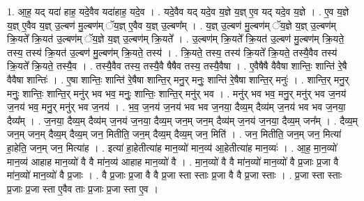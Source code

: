 \documentclass[17pt]{extarticle}
\begin{document}
1. आ॒ह॒ यद् यदा॑ हाह॒ यदे॒वैव यदा॑हाह॒ यदे॒व । . यदे॒वैव यद् यदे॒व य॒ज्ञे य॒ज्ञ् ए॒व यद् यदे॒व य॒ज्ञे । . ए॒व य॒ज्ञे य॒ज्ञ् ए॒वैव य॒ज्ञ् उ॒ल्बण॑ मु॒ल्बण॑म् ॅय॒ज्ञ् ए॒वैव य॒ज्ञ् उ॒ल्बण᳚म् । . य॒ज्ञ् उ॒ल्बण॑ मु॒ल्बण॑म् ॅय॒ज्ञे य॒ज्ञ् उ॒ल्बण॑म् क्रि॒यते᳚ क्रि॒यत॑ उ॒ल्बण॑म् ॅय॒ज्ञे य॒ज्ञ् उ॒ल्बण॑म् क्रि॒यते᳚ । . उ॒ल्बण॑म् क्रि॒यते᳚ क्रि॒यत॑ उ॒ल्बण॑ मु॒ल्बण॑म् क्रि॒यते॒ तस्य॒ तस्य॑ क्रि॒यत॑ उ॒ल्बण॑ मु॒ल्बण॑म् क्रि॒यते॒ तस्य॑ । . क्रि॒यते॒ तस्य॒ तस्य॑ क्रि॒यते᳚ क्रि॒यते॒ तस्यै॒वैव तस्य॑ क्रि॒यते᳚ क्रि॒यते॒ तस्यै॒व । . तस्यै॒वैव तस्य॒ तस्यै॒वै षैषैव तस्य॒ तस्यै॒वैषा । . ए॒वैषैषै वैवैषा शान्तिः॒ शान्ति॑ रे॒षै वैवैषा शान्तिः॑ । . ए॒षा शान्तिः॒ शान्ति॑ रे॒षैषा शान्ति॒र् मनु॒र् मनुः॒ शान्ति॑ रे॒षैषा शान्ति॒र् मनुः॑ । . शान्ति॒र् मनु॒र् मनुः॒ शान्तिः॒ शान्ति॒र् मनु॑र् भव भव॒ मनुः॒ शान्तिः॒ शान्ति॒र् मनु॑र् भव । . मनु॑र् भव भव॒ मनु॒र् मनु॑र् भव ज॒नय॑ ज॒नय॑ भव॒ मनु॒र् मनु॑र् भव ज॒नय॑ । . भ॒व॒ ज॒नय॑ ज॒नय॑ भव भव ज॒नया॒ दैव्य॒म् दैव्य॑म् ज॒नय॑ भव भव ज॒नया॒ दैव्य᳚म् । . ज॒नया॒ दैव्य॒म् दैव्य॑म् ज॒नय॑ ज॒नया॒ दैव्य॒म् जन॒म् जन॒म् दैव्य॑म् ज॒नय॑ ज॒नया॒ दैव्य॒म् जन᳚म् । . दैव्य॒म् जन॒म् जन॒म् दैव्य॒म् दैव्य॒म् जन॒ मितीति॒ जन॒म् दैव्य॒म् दैव्य॒म् जन॒ मिति॑ । . जन॒ मितीति॒ जन॒म् जन॒ मित्या॑ हा॒हेति॒ जन॒म् जन॒ मित्या॑ह । . इत्या॑ हा॒हेतीत्या॑ह मान॒व्यो॑ मान॒व्य॑ आ॒हेतीत्या॑ह मान॒व्यः॑ । . आ॒ह॒ मा॒न॒व्यो॑ मान॒व्य॑ आहाह मान॒व्यो॑ वै वै मा॑न॒व्य॑ आहाह मान॒व्यो॑ वै । . मा॒न॒व्यो॑ वै वै मा॑न॒व्यो॑ मान॒व्यो॑ वै प्र॒जाः प्र॒जा वै मा॑न॒व्यो॑ मान॒व्यो॑ वै प्र॒जाः । . वै प्र॒जाः प्र॒जा वै वै प्र॒जा स्ता स्ताः प्र॒जा वै वै प्र॒जा स्ताः । . प्र॒जा स्ता स्ताः प्र॒जाः प्र॒जा स्ता ए॒वैव ताः प्र॒जाः प्र॒जा स्ता ए॒व । \newline
\end{document}
